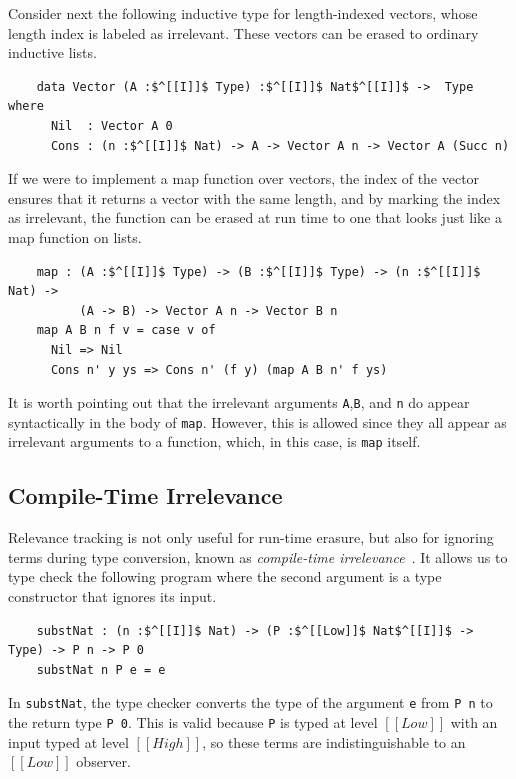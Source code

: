 \documentclass[acmsmall]{acmart}
\newcommand{\jws}[1]{}
\begin{document}
Consider next the following inductive type for length-indexed vectors,
whose length index is labeled as irrelevant.
These vectors can be erased to ordinary inductive lists.

\begin{lstlisting}
    data Vector (A :$^[[I]]$ Type) :$^[[I]]$ Nat$^[[I]]$ ->  Type where
      Nil  : Vector A 0
      Cons : (n :$^[[I]]$ Nat) -> A -> Vector A n -> Vector A (Succ n)
\end{lstlisting}

If we were to implement a map function over vectors,
the index of the vector ensures that it returns a vector with the same length,
and by marking the index as irrelevant,
the function can be erased at run time to one that looks just like a map function on lists.

\begin{lstlisting}
    map : (A :$^[[I]]$ Type) -> (B :$^[[I]]$ Type) -> (n :$^[[I]]$ Nat) ->
          (A -> B) -> Vector A n -> Vector B n
    map A B n f v = case v of
      Nil => Nil
      Cons n' y ys => Cons n' (f y) (map A B n' f ys)
\end{lstlisting}

It is worth pointing out that the irrelevant arguments \lstinline|A|,\lstinline|B|, and
\lstinline|n| do appear syntactically in the body of
\lstinline|map|. However, this is allowed since they all appear as irrelevant
arguments to a function, which, in this case, is \lstinline|map|
itself.

\subsection{Compile-Time Irrelevance}

Relevance tracking is not only useful for run-time erasure, but also
for ignoring terms during type conversion, known as \emph{compile-time
irrelevance}~\citep{debruijn1994automath}. It allows us to
type check the following program where the second
argument is a type constructor that ignores its input.
\begin{lstlisting}
    substNat : (n :$^[[I]]$ Nat) -> (P :$^[[Low]]$ Nat$^[[I]]$ ->  Type) -> P n -> P 0
    substNat n P e = e
\end{lstlisting}
In \lstinline{substNat}, the type checker converts the type of the
argument \lstinline{e} from \lstinline{P n} to the return type \lstinline{P 0}.
This is valid because \lstinline{P} is typed at level $[[Low]]$ with
an input typed at level $[[High]]$, so these terms are indistinguishable to an
$[[Low]]$ observer.
\end{document}
